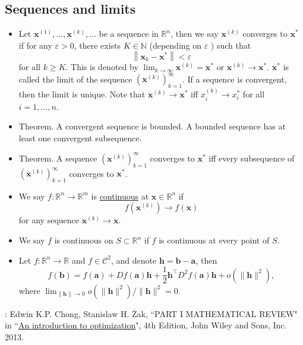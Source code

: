 \documentclass[12pt,thmsa]{article}
\begin{document}
\subsection{Sequences and limits}

\begin{itemize}
	\item Let \(\boldsymbol{x}^{(1)}, \ldots, \boldsymbol{x}^{(k)}, \ldots\) be a sequence in \(\mathbb{R}^n\), then we say \(\boldsymbol{x}^{(k)}\) converges to \(\boldsymbol{x}^*\) if for any \(\varepsilon>0\), there exists \(K \in \mathbb{N}\) (depending on \(\varepsilon\) ) such that
	\[
	\left\|\boldsymbol{x}_k-\boldsymbol{x}^*\right\|<\varepsilon
	\]
	for all \(k \geq K\). This is denoted by \(\lim _{k \rightarrow \infty} \boldsymbol{x}^{(k)}=\boldsymbol{x}^*\) or \(\boldsymbol{x}^{(k)} \rightarrow \boldsymbol{x}^*\). \(\boldsymbol{x}^*\) is called the limit of the sequence \(\left(\boldsymbol{x}^{(k)}\right)_{k=1}^{\infty}\). If a sequence is convergent, then the limit is unique. Note that \(\boldsymbol{x}^{(k)} \rightarrow \boldsymbol{x}^*\) iff \(x_i^{(k)} \rightarrow x_i^*\) for all \(i=1, \ldots, n\).

	\item Theorem. A convergent sequence is bounded. A bounded sequence has at least one convergent subsequence.

	\item Theorem. A sequence \(\left(\boldsymbol{x}^{(k)}\right)_{k=1}^{\infty}\) converges to \(\boldsymbol{x}^*\) iff every subsequence of \(\left(\boldsymbol{x}^{(k)}\right)_{k=1}^{\infty}\) converges to \(\boldsymbol{x}^*\).
	
	\item We say \(f: \mathbb{R}^n \rightarrow \mathbb{R}^m\) is \underline{continuous} at \(\boldsymbol{x} \in \mathbb{R}^n\) if
	\[
	f\left(\boldsymbol{x}^{(k)}\right) \rightarrow f(\boldsymbol{x})
	\]
	for any sequence \(\boldsymbol{x}^{(k)} \rightarrow \boldsymbol{x}\).
	
	\item We say \(f\) is continuous on \(S \subset \mathbb{R}^n\) if \(f\) is continuous at every point of \(S\).
	
	\item Let \(f: \mathbb{R}^n \rightarrow \mathbb{R}\) and \(f \in \mathcal{C}^2\), and denote \(\boldsymbol{h}=\boldsymbol{b}-\boldsymbol{a}\), then
	\[
	f(\boldsymbol{b})=f(\boldsymbol{a})+D f(\boldsymbol{a}) \boldsymbol{h}+\frac{1}{2} \boldsymbol{h}^{\top} D^2 f(\boldsymbol{a}) \boldsymbol{h}+o\left(\|\boldsymbol{h}\|^2\right),
	\]
	where \(\lim _{\|\boldsymbol{h}\| \rightarrow 0} o\left(\|\boldsymbol{h}\|^2\right) /\|\boldsymbol{h}\|^2=0\).

\end{itemize}



\bigskip

\noindent
[Ref]: Edwin K.P. Chong, Stanislaw H. Żak, ``PART I MATHEMATICAL REVIEW" in ``\href{https://www.amazon.com/Introduction-Optimization-Edwin-K-Chong/dp/1118279018}{An introduction to optimization}", 4th Edition, John Wiley and Sons, Inc. 2013.
\end{document}
